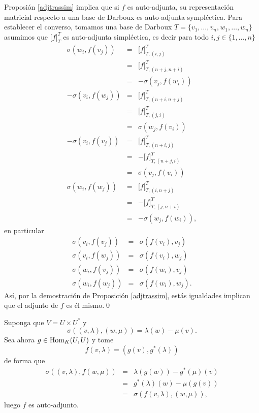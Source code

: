 \dem Proposi\'on \ref{adjtrassim} implica que si $f$ es auto-adjunta, su representaci\'on matricial respecto a una base de Darboux es auto-adjunta sympl\'ectica. Para establecer el converso, tomamos una base de Darboux $T=\{v_1,\ldots,v_n,w_1,\ldots,w_n\}$ asumimos que $\Big[f\Big]^T_T$ es auto-adjunta simpl\'ectica, es decir para todo $i,j\in\{1,\ldots,n\}$
\begin{eqnarray*}
\sigma\left(w_i,f(v_j)\right) & = & \Big[f\Big]^T_{T,(i,j)}\\
  & = & \Big[f\Big]^T_{T,(n+j,n+i)}\\
  & = & -\sigma\left(v_j,f(w_i)\right)\\
-\sigma\left(v_i,f(w_j)\right) & = & \Big[f\Big]^T_{T,(n+i,n+j)}\\
  & = & \Big[f\Big]^T_{T,(j,i)}\\
  & = & \sigma\left(w_j,f(v_i)\right)\\
-\sigma\left(v_i,f(v_j)\right) & = & \Big[f\Big]^T_{T,(n+i,j)}\\
  & = & -\Big[f\Big]^T_{T,(n+j,i)}\\
  & = & \sigma\left(v_j,f(v_i)\right)\\
\sigma\left(w_i,f(w_j)\right) & = & \Big[f\Big]^T_{T,(i,n+j)}\\
  & = & -\Big[f\Big]^T_{T,(j,n+i)}\\
  & = & -\sigma\left(w_j,f(w_i)\right),
\end{eqnarray*}
en particular
\begin{eqnarray*}
\sigma\left(v_i,f(v_j)\right) & = & \sigma\left(f(v_i),v_j\right)\\
\sigma\left(v_i,f(w_j)\right) & = & \sigma\left(f(v_i),w_j\right)\\
\sigma\left(w_i,f(v_j)\right) & = & \sigma\left(f(w_i),v_j\right)\\
\sigma\left(w_i,f(w_j)\right) & = & \sigma\left(f(w_i),w_j\right).
\end{eqnarray*}
As\'i, por la demostraci\'on de Proposici\'on \ref{adjtrassim}, est\'as igualdades implican que el adjunto de $f$ es \'el mismo.\qed

\begin{ejem}\label{ejemautoadj}
Suponga que $V=U\times U^*$ y
\[
\sigma\left((v,\lambda),(w,\mu)\right)=\lambda(w)-\mu(v).
\]
Sea ahora $g\in\operatorname{Hom}_K(U,U)$ y tome
\[
f(v,\lambda)=(g(v),g^*(\lambda))
\]
de forma que
\begin{eqnarray*}
\sigma\left((v,\lambda),f(w,\mu)\right) & = & \lambda(g(w))-g^*(\mu)(v)\\
 & = & g^*(\lambda)(w)-\mu(g(v))\\
 & = & \sigma\left(f(v,\lambda),(w,\mu)\right),
\end{eqnarray*}
luego $f$ es auto-adjunto.
\end{ejem}


